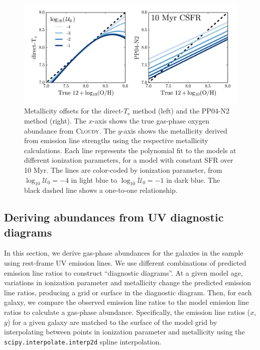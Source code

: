 \documentclass[trackchanges, preprint2]{aastex62}
\newcommand{\Cloudy}{\textsc{Cloudy}\xspace}
\newcommand{\logten}{\ensuremath{\log_{10}}}
\newcommand{\logUeq}[1]{\ensuremath{\logten \mathcal{U}_0 = #1}}
\newcommand{\Te}{\ensuremath{T_{\mathrm{e}}}\xspace}
\begin{document}
\begin{figure}
  \begin{center}
    \includegraphics[width=\linewidth]{figs/f2.png}
    \caption{Metallicity offsets for the direct-\Te method (left) and the PP04-N2 method (right). The $x$-axis shows the true gas-phase oxygen abundance from \Cloudy. The $y$-axis shows the metallicity derived from emission line strengths using the respective metallicity calculations. Each line represents the polynomial fit to the models at different ionization parameters, for a model with constant SFR over 10 Myr. The lines are color-coded by ionization parameter, from \logUeq{-4} in light blue to \logUeq{-1} in dark blue. The black dashed line shows a one-to-one relationship.}
    \label{fig:offset}
  \end{center}
\end{figure}

\subsection{Deriving abundances from UV diagnostic diagrams}\label{sec:Z:UV}

In this section, we derive gas-phase abundances for the galaxies in the sample using rest-frame UV emission lines. We use different combinations of predicted emission line ratios to construct ``diagnostic diagrams''. At a given model age, variations in ionization parameter and metallicity change the predicted emission line ratios, producing a grid or surface in the diagnostic diagram. Then, for each galaxy, we compare the observed emission line ratios to the model emission line ratios to calculate a gas-phase abundance. Specifically, the emission line ratios ($x$, $y$) for a given galaxy are matched to the surface of the model grid by interpolating between points in ionization parameter and metallicity using the {\tt scipy.interpolate.interp2d} spline interpolation.
\end{document}

